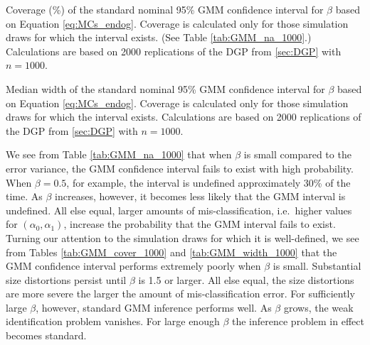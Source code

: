 \begin{table}[htbp]
  \small
  \centering
  
  \caption{Coverage (\%) of the standard nominal 95\% GMM confidence interval for $\beta$ based on Equation \ref{eq:MCs_endog}. Coverage is calculated only for those simulation draws for which the interval exists. (See Table \ref{tab:GMM_na_1000}.) Calculations are based on 2000 replications of the DGP from \ref{sec:DGP} with $n = 1000$.} 
  \label{tab:GMM_cover_1000}
\end{table}

\begin{table}[htbp]
  \small
  \centering
  
  \caption{Median width of the standard nominal 95\% GMM confidence interval for $\beta$ based on Equation \ref{eq:MCs_endog}. Coverage is calculated only for those simulation draws for which the interval exists. Calculations are based on 2000 replications of the DGP from \ref{sec:DGP} with $n = 1000$.} 
  \label{tab:GMM_width_1000}
\end{table}


We see from Table \ref{tab:GMM_na_1000} that when $\beta$ is small compared to the error variance, the GMM confidence interval fails to exist with high probability.
When $\beta = 0.5$, for example, the interval is undefined approximately 30\% of the time.
As $\beta$ increases, however, it becomes less likely that the GMM interval is undefined.
All else equal, larger amounts of mis-classification, i.e.\ higher values for $(\alpha_0, \alpha_1)$, increase the probability that the GMM interval fails to exist.
Turning our attention to the simulation draws for which it is well-defined, we see from Tables \ref{tab:GMM_cover_1000} and \ref{tab:GMM_width_1000} that the GMM confidence interval performs extremely poorly when $\beta$ is small.
Substantial size distortions persist until $\beta$ is 1.5 or larger.
All else equal, the size distortions are more severe the larger the amount of mis-classification error.
For sufficiently large $\beta$, however, standard GMM inference performs well.
As $\beta$ grows, the weak identification problem vanishes.
For large enough $\beta$ the inference problem in effect becomes standard.

